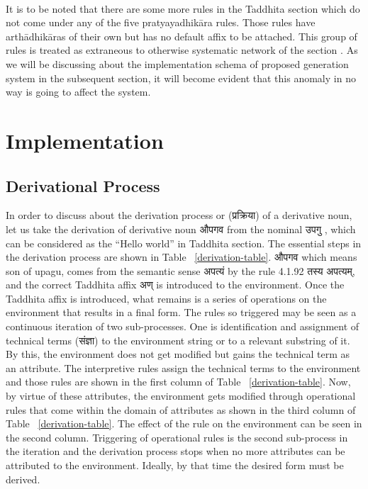 \documentclass[11pt]{article}
\begin{document}
\\
It is to be noted that there are some more rules in the Taddhita section which do not come under any of the five pratyayadhikāra rules. Those rules have arthādhikāras of their own but has no default affix to be attached. This group of rules is treated as extraneous to otherwise systematic network of the section \cite{bhate89}. As we will be discussing about the implementation schema of proposed generation system in the subsequent section, it will become evident that this anomaly in no way is going to affect the system.
  





\section{Implementation}
\label{sect:imple}

\subsection{Derivational Process}
\label{sect:intro-deri}

In order to discuss about the derivation process or ({\skt प्रक्रिया}) of a derivative noun, let us take the derivation of derivative noun {\skt औपगव} from the nominal {\skt उपगु  }, which can be considered as the 	``Hello world'' in Taddhita section. The essential steps in the derivation process are shown in Table ~\ref{derivation-table}. {\skt औपगव} which means son of upagu, comes from the semantic sense {\skt अपत्यं} by the rule 4.1.92 {\skt तस्य अपत्यम्}, and the correct Taddhita affix {\skt अण् } is introduced to the environment. Once the Taddhita affix is introduced, what remains is a series of operations on the environment that results in a final form. The rules so triggered may be seen as a continuous iteration of two sub-processes. One is identification and assignment of technical terms ({\skt संज्ञा}) to the environment string or to a relevant substring of it. By this, the environment does not get modified but gains the technical term as an attribute. The interpretive rules assign the technical terms to the environment and those rules are shown in the first column of Table ~\ref{derivation-table}. Now, by virtue of these attributes, the environment gets modified through operational rules that come within the domain of attributes as shown in the third column of Table ~\ref{derivation-table}. The effect of the rule on the environment can be seen in the second column. Triggering of operational rules is the second sub-process in the iteration and the derivation process stops when no more attributes can be attributed to the environment. Ideally, by that time the desired form must be derived. 
\end{document}
